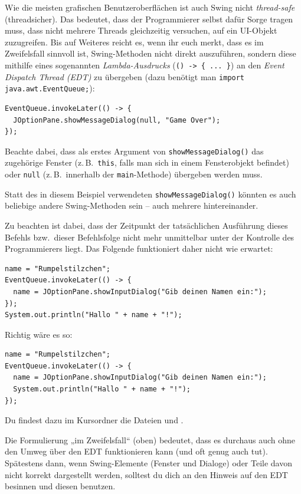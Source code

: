 Wie die meisten grafischen Benutzeroberflächen ist auch Swing nicht
\emph{thread-safe} (threadsicher). Das bedeutet, dass der Programmierer selbst
dafür Sorge tragen muss, dass nicht mehrere Threads gleichzeitig versuchen, auf
ein UI-Objekt zuzugreifen. Bis auf Weiteres reicht es, wenn ihr euch merkt,
dass es im Zweifelsfall sinnvoll ist, Swing-Methoden nicht direkt auszuführen,
sondern diese mithilfe eines sogenannten \emph{Lambda-Ausdrucks} (\verb|() -> { ... }|)
an den \emph{Event Dispatch Thread (EDT)} zu übergeben (dazu benötigt man
\verb|import java.awt.EventQueue;|):

\begin{lstlisting}
EventQueue.invokeLater(() -> {
  JOptionPane.showMessageDialog(null, "Game Over");
});
\end{lstlisting}

Beachte dabei, dass als erstes Argument von \verb|showMessageDialog()| das
zugehörige Fenster (z.\,B.\ \verb|this|, falls man sich in einem Fensterobjekt
befindet) oder \verb|null| (z.\,B.\ innerhalb der \verb|main|-Methode) übergeben
werden muss.

Statt des in diesem Beispiel verwendeten \verb|showMessageDialog()| könnten es
auch beliebige andere Swing-Methoden sein -- auch mehrere hintereinander.

Zu beachten ist dabei, dass der Zeitpunkt der tatsächlichen Ausführung dieses
Befehls bzw.\ dieser Befehlsfolge nicht mehr unmittelbar unter der Kontrolle des
Programmierers liegt. Das Folgende funktioniert daher nicht wie erwartet:

\begin{lstlisting}
name = "Rumpelstilzchen";
EventQueue.invokeLater(() -> {
  name = JOptionPane.showInputDialog("Gib deinen Namen ein:");
});
System.out.println("Hallo " + name + "!");
\end{lstlisting}

Richtig wäre es so:

\begin{lstlisting}
name = "Rumpelstilzchen";
EventQueue.invokeLater(() -> {
  name = JOptionPane.showInputDialog("Gib deinen Namen ein:");
  System.out.println("Hallo " + name + "!");
});
\end{lstlisting}

Du findest dazu im Kursordner die Dateien  und
.

Die Formulierung „im Zweifelsfall“ (oben) bedeutet, dass es durchaus auch ohne
den Umweg über den EDT funktionieren kann (und oft genug auch tut). Spätestens
dann, wenn Swing-Elemente (Fenster und Dialoge) oder Teile davon nicht korrekt
dargestellt werden, solltest du dich an den Hinweis auf den EDT besinnen und
diesen benutzen.
